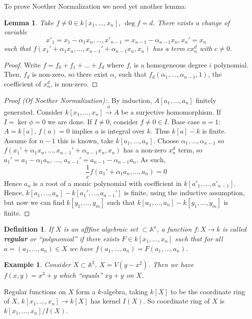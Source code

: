 \documentclass[12pt]{article}
\newcommand{\A}{\mathbb{A}}
\newtheorem{definition}{Definition}[section]
\newtheorem*{example}{Example}
\newtheorem{lemma}{Lemma}[section]
\begin{document}
    To prove Noether Normalization we need yet another lemma:
    \begin{lemma}
        Take $f \neq 0 \in k[x_1, \dots, x_n]$, $\deg f = d$. There exists a change of variable
         $$x'_1 = x_1 - \alpha_1 x_n, \dots, x'_{n-1} = x_{n-1} - \alpha_{n-1}x_n, x_n' = x_n$$
        such that $f(x_1' + \alpha_1x_n, \dots, x_{n-1}'+\alpha_{n-1}x_n, x_n)$ has a term $cx^d_n$ with $c \neq 0$.  
    \end{lemma}
    \begin{proof}
        Write $f = f_0 + f_1 + \dots + f_d$ where $f_i$ is a homogeneous degree $i$ polynomial. Then, $f_d$ is non-zero, so there exist $\alpha_i$ such that $f_d(\alpha_1, \dots, \alpha_{n-1}, 1)$, the coefficient of $x^d_n$, is non-zero.  
    \end{proof}
    \begin{proof}
        [Proof (Of Noether Normalization):] By induction, $A[a_1, \dots, a_n]$ finitely generated. Consider $k[x_1, \dots, x_n] \xrightarrow{\phi} A$ be a surjective homomorphism. If $I = \ker \phi = 0$ we are done. If $I \neq 0$, consider $f \neq 0 \in I$. Base case $n=1$: $A = k[a]$, $f(a) = 0$ implies $a$ is integral over $k$. Thus $k[a] - k$ is finite. Assume for $n-1$ this is known, take $k[a_1, \dots, a_n]$. Choose $\alpha_1, \dots, \alpha_{n-1}$ so $f(x_1' + \alpha_1x_n, \dots, x_{n-1}'+\alpha_{n-1}x_n, x_n)$ has a non-zero $x_n^d$ term, so $a_1' = a_1 - \alpha_1a_n$, ..., $a_{n-1}' = a_{n-1} - \alpha_{n-1}a_n$. As such, 
        $$\frac{1}{c}f(a_1' + \alpha_1a_n, \dots, a_n) = 0$$
        Hence $a_n$ is a root of a monic polynomial with coefficient in $k[a'_1, \dots, a'_{n-1}]$. Hence, $k[a_1, \dots, a_n] - k[a_1', \dots, a_{n-1}']$ is finite, using the inductive assumption, but now we can find $k[y_1, \dots, y_m]$ such that $k[a_1, \dots, a_n] - k[y_1, \dots, y_m]$ is finite. 
    \end{proof}
    \begin{definition}
        If $X$ is an afffine algebraic set $\subset \A^n$, a function $f: X \to k$ is called \textbf{regular} or ``polynomial'' if there exists $F \in k[x_1, \dots, x_n]$ such that for all $a = (a_1, \dots, a_n) \in X$ we have $f(a_1, \dots, a_n) = F(a_1, \dots, a_n)$. 
    \end{definition}
    \begin{example}
        Consider $X \subset \A^2$, $X = V(y-x^2)$. Then we have $f(x, y) = x^3 + y$ which ``equals'' $xy + y$ on $X$. 
    \end{example}
    Regular functions on $X$ form a $k$-algebra, taking $k[X]$ to be the coordinate ring of $X$, $k[x_1, \dots, x_n] \to k[X]$ has kernel $I(X)$. So coordinate ring of $X$ is $k[x_1, \dots, x_n]/I(X)$. 
\end{document}
